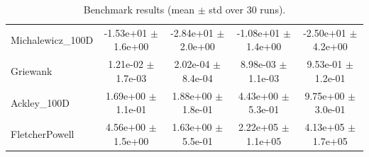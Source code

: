 \begin{table}[h]
\begin{tabular}{lcccc}
Michalewicz_100D & -1.53e+01 $\pm$ 1.6e+00 & -2.84e+01 $\pm$ 2.0e+00 & -1.08e+01 $\pm$ 1.4e+00 & -2.50e+01 $\pm$ 4.2e+00 \\
Griewank & 1.21e-02 $\pm$ 1.7e-03 & 2.02e-04 $\pm$ 8.4e-04 & 8.98e-03 $\pm$ 1.1e-03 & 9.53e-01 $\pm$ 1.2e-01 \\
Ackley_100D & 1.69e+00 $\pm$ 1.1e-01 & 1.88e+00 $\pm$ 1.8e-01 & 4.43e+00 $\pm$ 5.3e-01 & 9.75e+00 $\pm$ 3.0e-01 \\
FletcherPowell & 4.56e+00 $\pm$ 1.5e+00 & 1.63e+00 $\pm$ 5.5e-01 & 2.22e+05 $\pm$ 1.1e+05 & 4.13e+05 $\pm$ 1.7e+05 \\
\hline
\end{tabular}
\caption{Benchmark results (mean $\pm$ std over 30 runs).}
\end{table}
